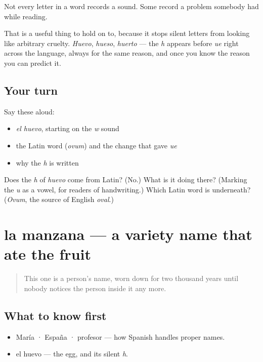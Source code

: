\begin{grammarlens}[title={What you've built}]
Not every letter in a word records a sound. Some record a problem somebody had while reading.

That is a useful thing to hold on to, because it stops silent letters from looking like arbitrary cruelty. \emph{Huevo}, \emph{hueso}, \emph{huerto} — the \emph{h} appears before \emph{ue} right across the language, always for the same reason, and once you know the reason you can predict it.
\end{grammarlens}

\subsection*{Your turn}
Say these aloud:

\begin{itemize}
\raggedright
  \item \emph{el huevo}, starting on the \emph{w} sound
  \item the Latin word (\emph{ovum}) and the change that gave \emph{ue}
  \item why the \emph{h} is written
\end{itemize}

\begin{tcolorbox}[breakable,colback=teal!4,colframe=teal!35!black,title={Before you move on}]
Does the \emph{h} of \emph{huevo} come from Latin? (No.) What is it doing there? (Marking the \emph{u} as a vowel, for readers of handwriting.) Which Latin word is underneath? (\emph{Ovum}, the source of English \emph{oval}.)
\end{tcolorbox}
\section[la manzana]{la manzana — a variety name that ate the fruit}

\label{lesson:ES-C280-manzana}



\begin{quote}
This one is a person's name, worn down for two thousand years until nobody notices the person inside it any more.
\end{quote}

\subsection*{What to know first}
\begin{itemize}
\raggedright
  \item María · España · profesor — how Spanish handles proper names.
  \item el huevo — the egg, and its silent \emph{h}.
\end{itemize}

